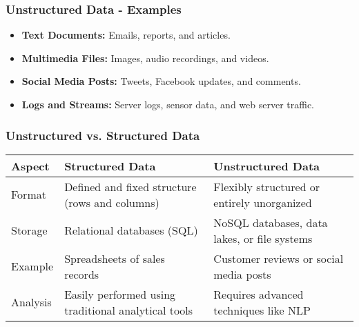 \documentclass[aspectratio=169]{beamer}
\begin{document}
\begin{frame}[fragile]
    \frametitle{Unstructured Data - Examples}
    \begin{itemize}
        \item \textbf{Text Documents:} Emails, reports, and articles.
        \item \textbf{Multimedia Files:} Images, audio recordings, and videos.
        \item \textbf{Social Media Posts:} Tweets, Facebook updates, and comments.
        \item \textbf{Logs and Streams:} Server logs, sensor data, and web server traffic.
    \end{itemize}
\end{frame}

\begin{frame}[fragile]
    \frametitle{Unstructured vs. Structured Data}
    \begin{table}[]
        \begin{tabular}{|l|l|l|}
            \hline
            \textbf{Aspect} & \textbf{Structured Data} & \textbf{Unstructured Data} \\ \hline
            Format           & Defined and fixed structure (rows and columns) & Flexibly structured or entirely unorganized \\ \hline
            Storage          & Relational databases (SQL) & NoSQL databases, data lakes, or file systems \\ \hline
            Example          & Spreadsheets of sales records & Customer reviews or social media posts \\ \hline
            Analysis         & Easily performed using traditional analytical tools & Requires advanced techniques like NLP \\ \hline
        \end{tabular}
    \end{table}
\end{frame}
\end{document}
